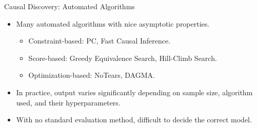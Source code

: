 \documentclass{beamer}
\begin{document}
\begin{frame}{Causal Discovery: Automated Algorithms}
	\begin{itemize}
		\item Many automated algorithms with nice asymptotic properties.
			\begin{itemize}
				\item Constraint-based: PC, Fast Causal Inference.
				\item Score-based: Greedy Equivalence Search, Hill-Climb Search.
				\item Optimization-based: NoTears, DAGMA.
			\end{itemize}
		\item In practice, output varies significantly depending on sample size,
			algorithm used, and their hyperparameters.
		\item With no standard evaluation method, difficult to decide the correct model.
	\end{itemize}
\end{frame}
\end{document}
